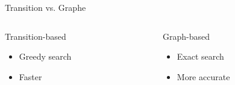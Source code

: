 \documentclass[
	hyperref={unicode},
	xcolor={svgnames, table},
	aspectratio=169,
	french,
]{beamer}
\begin{document}
\begin{frame}{Transition vs. Graphe}
		\begin{overlayarea}{\textwidth}{0.6\textheight}
	\begin{columns}
		\begin{column}{0.45\textwidth}
			\begin{block}{Transition-based}
				\begin{itemize}
					\item<2-> Greedy search
					\item<3-> Faster
				\end{itemize}
			\end{block}
		\end{column}
		\begin{column}{0.45\textwidth}
			\begin{block}{Graph-based}
				\begin{itemize}
					\item<2-> Exact search
					\item<3-> More accurate
				\end{itemize}
			\end{block}
		\end{column}
	\end{columns}
\end{overlayarea}
\end{frame}
\end{document}
